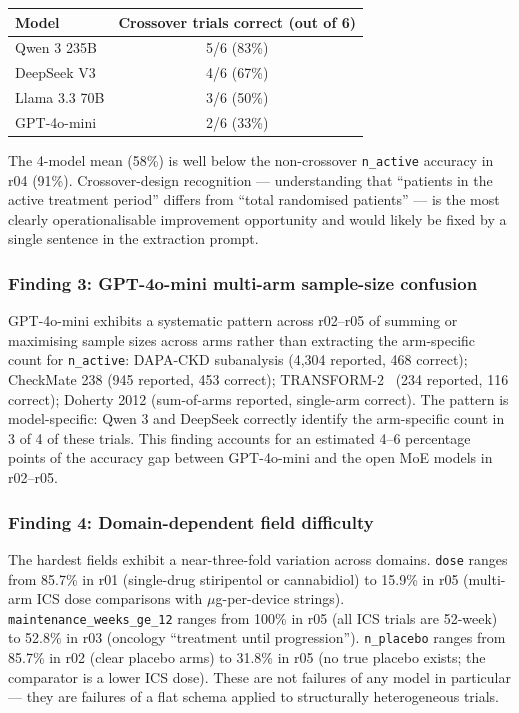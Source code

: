 \documentclass[a4paper,fleqn]{cas-sc}
\begin{document}
\begin{center}
\begin{tabular}{lc}
\toprule
Model & Crossover trials correct (out of 6) \\
\midrule
Qwen 3 235B    & 5/6 (83\%) \\
DeepSeek V3    & 4/6 (67\%) \\
Llama 3.3 70B  & 3/6 (50\%) \\
GPT-4o-mini    & 2/6 (33\%) \\
\bottomrule
\end{tabular}
\end{center}

The 4-model mean (58\%) is well below the non-crossover \texttt{n\_active}
accuracy in r04 (91\%). Crossover-design recognition --- understanding
that ``patients in the active treatment period'' differs from
``total randomised patients'' --- is the most clearly operationalisable
improvement opportunity and would likely be fixed by a single sentence
in the extraction prompt.

\subsubsection{Finding 3: GPT-4o-mini multi-arm sample-size confusion}

GPT-4o-mini exhibits a systematic pattern across r02--r05 of
summing or maximising sample sizes across arms rather than extracting
the arm-specific count for \texttt{n\_active}:
DAPA-CKD subanalysis (4{,}304 reported, 468 correct);
CheckMate 238 (945 reported, 453 correct);
TRANSFORM-2~\citep{popova2019transform2} (234 reported, 116 correct);
Doherty 2012 (sum-of-arms reported, single-arm correct).
The pattern is model-specific: Qwen 3 and DeepSeek correctly identify
the arm-specific count in 3 of 4 of these trials. This finding accounts
for an estimated 4--6 percentage points of the accuracy gap between
GPT-4o-mini and the open MoE models in r02--r05.

\subsubsection{Finding 4: Domain-dependent field difficulty}

The hardest fields exhibit a near-three-fold variation across domains.
\texttt{dose} ranges from 85.7\% in r01 (single-drug stiripentol
or cannabidiol) to 15.9\% in r05 (multi-arm ICS dose comparisons with
$\mu$g-per-device strings).
\texttt{maintenance\_weeks\_ge\_12} ranges from 100\% in r05
(all ICS trials are 52-week) to 52.8\% in r03 (oncology
``treatment until progression'').
\texttt{n\_placebo} ranges from 85.7\% in r02 (clear placebo arms) to
31.8\% in r05 (no true placebo exists; the comparator is a lower ICS
dose). These are not failures of any model in particular --- they are
failures of a flat schema applied to structurally heterogeneous trials.
\end{document}
